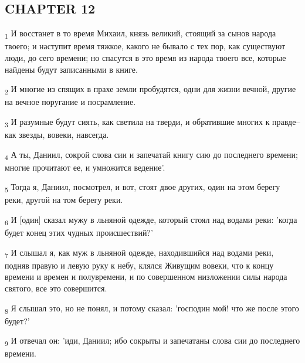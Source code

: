 \subsection{CHAPTER 12}
\begin{tcolorbox}
\textsubscript{1} И восстанет в то время Михаил, князь великий, стоящий за сынов народа твоего; и наступит время тяжкое, какого не бывало с тех пор, как существуют люди, до сего времени; но спасутся в это время из народа твоего все, которые найдены будут записанными в книге.
\end{tcolorbox}
\begin{tcolorbox}
\textsubscript{2} И многие из спящих в прахе земли пробудятся, одни для жизни вечной, другие на вечное поругание и посрамление.
\end{tcolorbox}
\begin{tcolorbox}
\textsubscript{3} И разумные будут сиять, как светила на тверди, и обратившие многих к правде--как звезды, вовеки, навсегда.
\end{tcolorbox}
\begin{tcolorbox}
\textsubscript{4} А ты, Даниил, сокрой слова сии и запечатай книгу сию до последнего времени; многие прочитают ее, и умножится ведение'.
\end{tcolorbox}
\begin{tcolorbox}
\textsubscript{5} Тогда я, Даниил, посмотрел, и вот, стоят двое других, один на этом берегу реки, другой на том берегу реки.
\end{tcolorbox}
\begin{tcolorbox}
\textsubscript{6} И [один] сказал мужу в льняной одежде, который стоял над водами реки: 'когда будет конец этих чудных происшествий?'
\end{tcolorbox}
\begin{tcolorbox}
\textsubscript{7} И слышал я, как муж в льняной одежде, находившийся над водами реки, подняв правую и левую руку к небу, клялся Живущим вовеки, что к концу времени и времен и полувремени, и по совершенном низложении силы народа святого, все это совершится.
\end{tcolorbox}
\begin{tcolorbox}
\textsubscript{8} Я слышал это, но не понял, и потому сказал: 'господин мой! что же после этого будет?'
\end{tcolorbox}
\begin{tcolorbox}
\textsubscript{9} И отвечал он: 'иди, Даниил; ибо сокрыты и запечатаны слова сии до последнего времени.
\end{tcolorbox}
